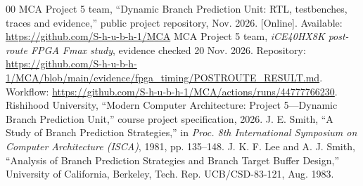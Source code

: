 \documentclass[conference,a4paper]{IEEEtran}
\begin{document}
\begin{thebibliography}{00}
 MCA Project 5 team, ``Dynamic Branch Prediction Unit: RTL, testbenches, traces and evidence,'' public project repository, Nov. 2026. [Online]. Available: \url{https://github.com/S-h-u-b-h-1/MCA}
 MCA Project 5 team, \emph{iCE40HX8K post-route FPGA Fmax study}, evidence checked 20 Nov. 2026. Repository: \url{https://github.com/S-h-u-b-h-1/MCA/blob/main/evidence/fpga_timing/POSTROUTE_RESULT.md}. Workflow: \url{https://github.com/S-h-u-b-h-1/MCA/actions/runs/44777766230}.
 Rishihood University, ``Modern Computer Architecture: Project 5---Dynamic Branch Prediction Unit,'' course project specification, 2026.
 J. E. Smith, ``A Study of Branch Prediction Strategies,'' in \emph{Proc. 8th International Symposium on Computer Architecture (ISCA)}, 1981, pp. 135--148.
 J. K. F. Lee and A. J. Smith, ``Analysis of Branch Prediction Strategies and Branch Target Buffer Design,'' University of California, Berkeley, Tech. Rep. UCB/CSD-83-121, Aug. 1983.
\end{thebibliography}
\end{document}
